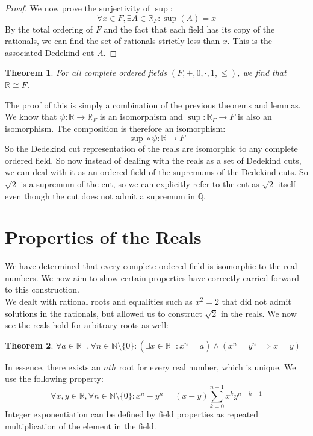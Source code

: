 \documentclass{article}
\newtheorem{thm}{Theorem}[section]
\begin{document}
\begin{proof}
We now prove the surjectivity of $\sup$:
\begin{equation*}
    \forall x \in F, \exists A \in \mathbb{R}_F: \sup(A) = x
\end{equation*}
By the total ordering of $F$ and the fact that each field has its copy of the rationals, we can find the set of rationals strictly less than $x$. This is the associated Dedekind cut $A$.
\end{proof}

\medskip
\begin{thm}
For all complete ordered fields $(F, +, 0, \cdot, 1, \leqslant)$, we find that $\mathbb{R} \cong F$.
\end{thm}
The proof of this is simply a combination of the previous theorems and lemmas. We know that $\psi: \mathbb{R} \xrightarrow{} \mathbb{R}_F$ is an isomorphism and $\sup: \mathbb{R}_F \xrightarrow{} F$ is also an isomorphism. The composition is therefore an isomorphism:
\begin{equation*}
    \sup \circ \psi: \mathbb{R} \xrightarrow{} F
\end{equation*}
So the Dedekind cut representation of the reals are isomorphic to any complete ordered field. So now instead of dealing with the reals as a set of Dedekind cuts, we can deal with it as an ordered field of the supremums of the Dedekind cuts. So $\sqrt{2}$ is a supremum of the cut, so we can explicitly refer to the cut as $\sqrt{2}$ itself even though the cut does not admit a supremum in $\mathbb{Q}$. 
\pagebreak


\section{Properties of the Reals}
We have determined that every complete ordered field is isomorphic to the real numbers. We now aim to show certain properties have correctly carried forward to this construction.\\

We dealt with rational roots and equalities such as $x^2 = 2$ that did not admit solutions in the rationals, but allowed us to construct $\sqrt{2}$ in the reals. We now see the reals hold for arbitrary roots as well:
\begin{thm}
$\forall a \in \mathbb{R}^+, \forall n \in \mathbb{N}\setminus \{0\}: (\exists x \in \mathbb{R}^+: x^n = a) \land (x^n = y^n \implies x = y)$
\end{thm}
In essence, there exists an $nth$ root for every real number, which is unique. We use the following property:
\begin{equation*}
    \forall x, y \in \mathbb{R}, \forall n \in \mathbb{N}\setminus \{0\}: x^n - y^n = (x-y)\sum_{k=0}^{n-1}x^k y^{n-k-1}
\end{equation*}
Integer exponentiation can be defined by field properties as repeated multiplication of the element in the field.\\
\end{document}
